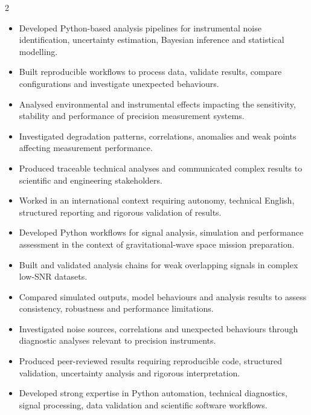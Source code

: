 \documentclass[8pt,a4paper,ragged2e,withhyper]{altacv}
\begin{document}
\begin{paracol}{2}
\begin{itemize}
\item Developed Python-based analysis pipelines for instrumental noise identification, uncertainty estimation, Bayesian inference and statistical modelling.
\item Built reproducible workflows to process data, validate results, compare configurations and investigate unexpected behaviours.
\item Analysed environmental and instrumental effects impacting the sensitivity, stability and performance of precision measurement systems.
\item Investigated degradation patterns, correlations, anomalies and weak points affecting measurement performance.
\item Produced traceable technical analyses and communicated complex results to scientific and engineering stakeholders.
\item Worked in an international context requiring autonomy, technical English, structured reporting and rigorous validation of results.
\end{itemize}

\divider


\begin{itemize}
\item Developed Python workflows for signal analysis, simulation and performance assessment in the context of gravitational-wave space mission preparation.
\item Built and validated analysis chains for weak overlapping signals in complex low-SNR datasets.
\item Compared simulated outputs, model behaviours and analysis results to assess consistency, robustness and performance limitations.
\item Investigated noise sources, correlations and unexpected behaviours through diagnostic analyses relevant to precision instruments.
\item Produced peer-reviewed results requiring reproducible code, structured validation, uncertainty analysis and rigorous interpretation.
\item Developed strong expertise in Python automation, technical diagnostics, signal processing, data validation and scientific software workflows.
\end{itemize}


\end{paracol}
\end{document}
